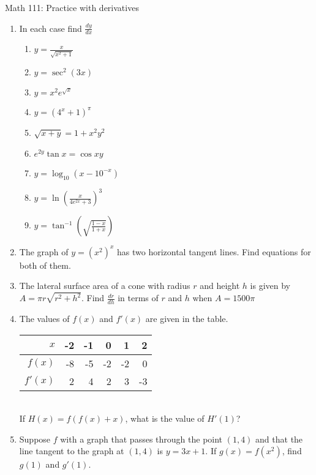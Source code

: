 \documentclass[11pt]{article}
\begin{document}
\begin{center}
\Large
\rm{Math 111:  Practice with derivatives}
\\
\end{center}
\vspace{0.2in}

\begin{enumerate}
\item{In each case find $\frac{dy}{dx}$
\begin{enumerate}
\item{$y = \frac{x}{\sqrt{x^2+1}}$}
\vspace{0.2in}
\item{$y = \sec^2{(3x)}$}
\vspace{0.2in}
\item{$y = x^2e^{\sqrt{x}}$}
\vspace{0.2in}
\item{$y = (4^x+1)^{\pi}$}
\vspace{0.2in}
\item{$\sqrt{x+y} = 1+x^2y^2$}
\vspace{0.2in}
\item{$e^{2y}\tan{x} = \cos{xy}$}
\vspace{0.2in}
\item{$y = \log_{10}{(x-10^{-x})}$}
\vspace{0.2in}
\item{$y = \ln{\left( \frac{x}{4e^{2x}+3}\right)^3}$}
\vspace{0.2in}
\item{$y = \tan^{-1}{\left( \sqrt{\frac{1-x}{1+x}} \right)}$}
\end{enumerate}
}
\item{The graph of $y=(x^2)^x$ has two horizontal tangent lines.   Find equations for both of them.}
\item{The lateral surface area of a cone with radius $r$ and height $h$ is given by $A=\pi r\sqrt{r^2+h^2}$.  Find $\frac{dr}{dh}$ in terms of
$r$ and $h$ when $A=1500\pi$}
\item{The values of $f(x)$ and $f'(x)$ are given in the table.}
\vspace{.15in}

\begin{tabular}{|r|r|r|r|r|r|}
\hline
$x$& -2 & -1 & 0 & 1 & 2   \\
\hline
$f(x)$& -8 & -5 & -2 & -2 & 0   \\
\hline
$f'(x)$& 2 & 4 & 2 & 3 & -3  \\
\hline
\end{tabular}
\vspace{.15in}
\\
If $H(x) = f(f(x)+x)$, what is the value of $H'(1)$?
\item{Suppose $f$ with a graph that passes through the point $(1,4)$ and that the line tangent to the graph at $(1,4)$ is $y=3x+1$.
  If $g(x) = f(x^2)$, find $g(1)$ and $g'(1)$.
}
  
\end{enumerate}
\end{document}
